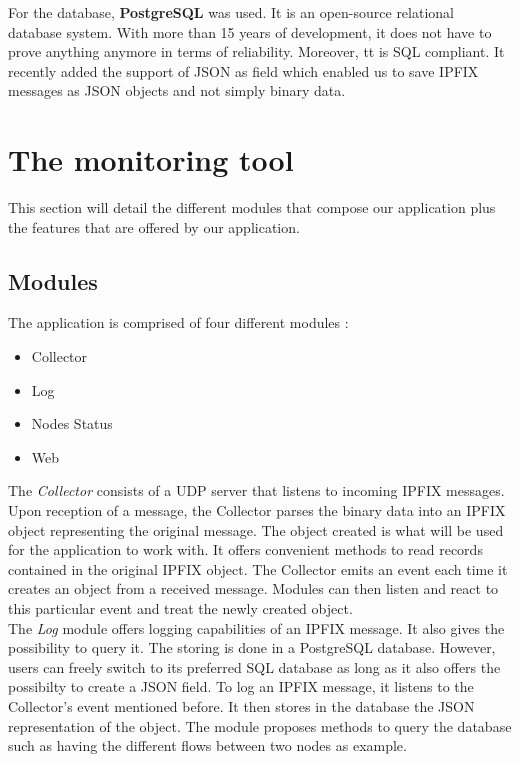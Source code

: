 For the database, \textbf{PostgreSQL} \cite{website:postgresql} was used. It is an open-source relational database system. With more than 15 years of development, it does not have to prove anything anymore in terms of reliability. Moreover, tt is SQL compliant. It recently added the support of JSON as field which enabled us to save IPFIX messages as JSON objects and not simply binary data.

\section{The monitoring tool}

This section will detail the different modules that compose our application plus the features that are offered by our application.

\subsection{Modules}

The application is comprised of four different modules :
\begin{itemize}
	\item Collector
	\item Log
	\item Nodes Status
	\item Web \\
\end{itemize}

The \textit{Collector} consists of a UDP server that listens to incoming IPFIX messages. Upon reception of a message, the Collector parses the binary data into an IPFIX object representing the original message. The object created is what will be used for the application to work with. It offers convenient methods to read records contained in the original IPFIX object. The Collector emits an event each time it creates an object from a received message. Modules can then listen and react to this particular event and treat the newly created object. \\

The \textit{Log} module offers logging capabilities of an IPFIX message. It also gives the possibility to query it. The storing is done in a PostgreSQL database. However, users can freely switch to its preferred SQL database as long as it also offers the possibilty to create a JSON field. To log an IPFIX message, it listens to the Collector's event mentioned before. It then stores in the database the JSON representation of the object. The module proposes methods to query the database such as having the different flows between two nodes as example. \\

